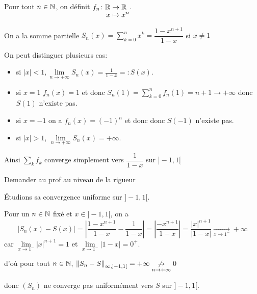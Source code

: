 \documentclass[a4paper, 12pt]{article}
\begin{document}
\begin{exemple}
    Pour tout $n \in \mathbb{N}$, on définit $\funcdef{f_n}{\R}{\R}{x}{x^n}$.

    On a la somme partielle $S_n(x) = \sum\limits_{k=0}^n x^k = \dfrac{1-x^{n+1}}{1-x}$ si $x \neq 1$

    On peut distinguer plusieurs cas:

    \begin{itemize}[label=--]
        \item si $|x| < 1, \lim\limits_{n \to +\infty} S_n(x) = \frac{1}{1-x} =: S(x)$.
        \item si $x = 1$ $f_n(x) = 1$ et donc $S_n(1) = \sum\limits_{k=0}^n f_n(1) = n + 1 \to +\infty$ donc $S(1)$ n'existe pas.
        \item si $x = -1$ on a $f_n(x) = (-1)^n$ et donc  donc $S(-1)$ n'existe pas.
        \item si $|x| > 1$, $\lim\limits_{n \to +\infty} S_n(x) = +\infty$.
    \end{itemize}

    Ainsi $\sum\limits_{k}f_k$ converge simplement vers $\dfrac{1}{1 - x}$ sur $]-1, 1[$

    \vspace{1cm}
    
    \begin{hotwarn}
        Demander au prof au niveau de la rigueur
    \end{hotwarn}

    Étudions sa convergence uniforme sur $]-1, 1[$.

    Pour un $n \in \mathbb{N}$ fixé et $x \in ]-1, 1[$, on a
    $$
    |S_n(x) - S(x)| = \left|\dfrac{1 - x^{n+1}}{1 - x} - \dfrac{1}{1 - x}\right| = \left|\dfrac{-x^{n+1}}{1 - x}\right| = \dfrac{|x|^{n+1}}{|1 - x|} \underset{x \to 1^-}{\to} +\infty
    $$
    car $\lim\limits_{x \to 1^-} |x|^{n+1} = 1$ et $\lim\limits_{x \to 1^-} |1 - x| = 0^+$.

    d'où pour tout $n \in \mathbb{N}$, $\left\lVert S_n - S\right\rVert_{\infty, ]-1, 1[} = +\infty \underset{n \to +\infty}{\not\to} 0$ \par donc
    $(S_n)$ ne converge pas uniformément vers $S$ sur $]-1, 1[$.

    \vspace{1cm}


\end{exemple}
\end{document}
